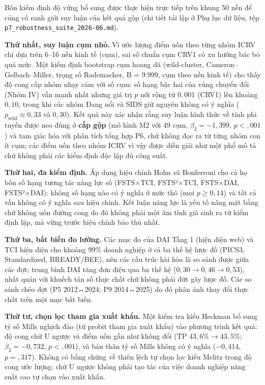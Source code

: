 \documentclass[
  a4paper,
  13pt]{extreport}
\begin{document}
Bốn kiểm định độ vững bổ sung được thực hiện trực tiếp trên khung 50 nền
để củng cố ranh giới suy luận của kết quả gộp (chi tiết tái lập ở Phụ
lục dữ liệu, tệp \texttt{p7\_robustness\_suite\_2026-06.md}).

\textbf{Thứ nhất, suy luận cụm nhỏ.} Vì ước lượng điểm uốn theo từng
nhóm ICRV chỉ dựa trên 6--16 nền kinh tế (cụm), sai số chuẩn cụm CRV1 có
xu hướng bác bỏ quá mức. Một kiểm định bootstrap cụm hoang dã
(wild-cluster, Cameron--Gelbach--Miller, trọng số Rademacher, B = 9.999,
cụm theo nền kinh tế) cho thấy độ cong cấp nhóm nhạy cảm với số cụm: số
hạng bậc hai của vùng chuyển đổi (Nhóm IV) vẫn mạnh nhất nhưng giá trị
\(p\) nới rộng từ \(0{,}001\) (CRV1) lên khoảng \(0{,}10\), trong khi
các nhóm Đang nổi và SIDS giữ nguyên không có ý nghĩa
(\(p_{\text{wild}} \approx 0{,}33\) và \(0{,}30\)). Kết quả này xác nhận
rằng suy luận hình thức về tính phi tuyến được neo đúng ở \textbf{cấp
gộp} (mô hình M2 với 49 cụm, \(\beta_2 = -1{,}399\), \(p < {,}001\)) và
tam giác hóa với phân tích tổng hợp P6, chứ không đọc ra từ từng nhóm
con ít cụm; các điểm uốn theo nhóm ICRV vì vậy được diễn giải như một
phổ mô tả chứ không phải các kiểm định độc lập đủ công suất.

\textbf{Thứ hai, đa kiểm định.} Áp dụng hiệu chỉnh Holm và Bonferroni
cho cả họ bốn số hạng tương tác năng lực số (FSTS×TCI, FSTS²×TCI,
FSTS×DAI, FSTS²×DAI): không số hạng nào có ý nghĩa ở mức thô (mọi
\(p \ge 0{,}14\)) và tất cả vẫn không có ý nghĩa sau hiệu chỉnh. Kết
luận năng lực là yếu tố nâng mặt bằng chứ không uốn đường cong do đó
không phải một âm tính giả sinh ra từ kiểm định lặp, mà vững trước hiệu
chỉnh bảo thủ nhất.

\textbf{Thứ ba, bất biến đo lường.} Các mục đo của DAI Tầng 1 (hiện diện
web) và TCI hiện diện cho khoảng \(99\%\) doanh nghiệp ở cả ba thế hệ
lược đồ (PICS3, Standardized, BREADY/BEE), nên các cấu trúc hài hòa là
so sánh được giữa các đợt; trung bình DAI tăng đơn điệu qua ba thế hệ
(\(0{,}30 \to 0{,}46 \to 0{,}53\)), nhất quán với khuếch tán số thực
chất chứ không phải đứt gãy lược đồ. Các so sánh chéo đợt (P5 2012↔2024;
P9 2014↔2025) do đó phản ánh thay đổi thực chất trên một mục bất biến.

\textbf{Thứ tư, chọn lọc tham gia xuất khẩu.} Một kiểm tra kiểu Heckman
bổ sung tỷ số Mills nghịch đảo (từ probit tham gia xuất khẩu) vào phương
trình kết quả: độ cong chữ U ngược và điểm uốn gần như không đổi
(\(\text{TP}\) \(43{,}6\% \to 43{,}5\%\); \(\beta_2 = -0{,}732\),
\(p < {,}001\)), và bản thân tỷ số Mills không có ý nghĩa (\(-0{,}414\),
\(p = {,}317\)). Không có bằng chứng về thiên lệch tự chọn lọc kiểu
Melitz trong độ cong ước lượng: chữ U ngược không phải tạo tác của việc
doanh nghiệp năng suất cao tự chọn vào xuất khẩu.
\end{document}
